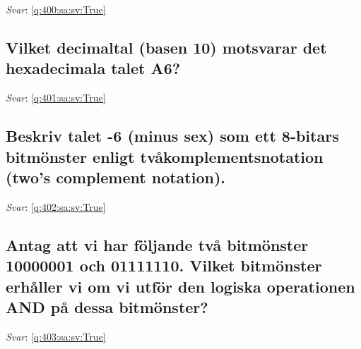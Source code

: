 \documentclass[a4paper,11pt,oneside]{article}
\begin{document}
\begin{sloppypar}
\noindent\makebox[\textwidth]{\hrulefill}

\vspace{1cm}

\textit{Svar}: \autoref{q:400:sa:sv:True}



\subsection{Vilket decimaltal (basen 10) motsvarar det hexadecimala talet A6?}

\label{q:401:sa:sv:False}

\vspace{2cm}

\noindent\makebox[\textwidth]{\hrulefill}

\vspace{1cm}

\textit{Svar}: \autoref{q:401:sa:sv:True}



\subsection{Beskriv talet -6 (minus sex) som ett 8-bitars bitm\"onster enligt tv\r{a}komplementsnotation (two{\textquoteright}s complement notation).}

\label{q:402:sa:sv:False}

\vspace{2cm}

\noindent\makebox[\textwidth]{\hrulefill}

\vspace{1cm}

\textit{Svar}: \autoref{q:402:sa:sv:True}



\subsection{Antag att vi har f\"oljande tv\r{a} bitm\"onster 10000001 och 01111110. Vilket bitm\"onster erh\r{a}ller vi om vi utf\"or den logiska operationen AND p\r{a} dessa bitm\"onster?}

\label{q:403:sa:sv:False}

\vspace{2cm}

\noindent\makebox[\textwidth]{\hrulefill}

\vspace{1cm}

\textit{Svar}: \autoref{q:403:sa:sv:True}




\end{sloppypar}
\end{document}
